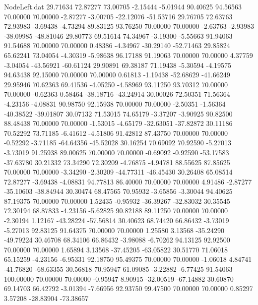 \begin{filecontents}{NodeLeft.dat}
  29.71634   72.87277   73.00705    -2.15444   -5.01944   90.40625   94.56563   70.00000   70.00000   -2.87277   -3.00705  -22.12076  -51.53716
  29.76705   72.63763   72.93983    -3.69438   -4.73294   89.83125   93.76250   70.00000   70.00000   -2.63763   -2.93983  -38.09985  -48.81046
  29.80773   69.51614   74.34967    -3.19300   -5.55663   91.94063   91.54688   70.00000   70.00000    0.48386   -4.34967  -30.29140  -52.71463
  29.85824   65.62241   73.04054    -4.30319   -5.98638   96.17188   91.19063   70.00000   70.00000    4.37759   -3.04054  -43.56921  -60.61124
  29.90891   69.38187   71.19438    -5.30594   -4.19575   94.63438   92.15000   70.00000   70.00000    0.61813   -1.19438  -52.68629  -41.66249
  29.95946   70.62363   69.41536    -4.05250   -4.58969   93.11250   93.70312   70.00000   70.00000   -0.62363    0.58464  -38.18716  -43.24914
  30.00026   72.50351   71.56364    -4.23156   -4.08831   90.98750   92.15938   70.00000   70.00000   -2.50351   -1.56364  -40.38522  -39.01807
  30.07132   71.53015   74.65179    -3.37207   -3.90925   90.82500   88.48438   70.00000   70.00000   -1.53015   -4.65179  -32.63051  -37.82872
  30.11186   70.52292   73.71185    -6.41612   -4.51806   91.42812   87.43750   70.00000   70.00000   -0.52292   -3.71185  -64.64356  -45.52028
  30.16254   70.69092   70.92590    -5.27013   -3.73019   91.25938   89.00625   70.00000   70.00000   -0.69092   -0.92590  -53.17583  -37.63780
  30.21332   73.34290   72.30209    -4.76875   -4.94781   88.55625   87.85625   70.00000   70.00000   -3.34290   -2.30209  -44.77311  -46.45430
  30.26408   65.08514   72.87277    -3.69438   -4.08831   94.77813   86.40000   70.00000   70.00000    4.91486   -2.87277  -35.10603  -38.84944
  30.30474   68.47565   70.95932    -3.65856   -3.30044   94.40625   87.19375   70.00000   70.00000    1.52435   -0.95932  -36.39267  -32.83032
  30.35545   72.30194   68.87833    -4.23156   -5.62825   90.82188   89.11250   70.00000   70.00000   -2.30194    1.12167  -43.28224  -57.56814
  30.40623   68.74420   66.86432    -3.73019   -5.27013   92.83125   91.64375   70.00000   70.00000    1.25580    3.13568  -35.24290  -49.79224
  30.46708   68.34106   66.86432    -3.98088   -6.70262   94.13125   92.92500   70.00000   70.00000    1.65894    3.13568  -37.45205  -63.05822
  30.51770   71.06018   65.15259    -4.23156   -6.95331   92.18750   95.49375   70.00000   70.00000   -1.06018    4.84741  -41.76820  -68.63355
  30.56818   70.95947   61.09085    -3.22882   -6.77425   91.54063  100.00000   70.00000   70.00000   -0.95947    8.90915  -32.00519  -67.14882
  30.60870   69.14703   66.42792    -3.01394   -7.66956   92.93750   99.47500   70.00000   70.00000    0.85297    3.57208  -28.83904  -73.38657

\end{filecontents}

